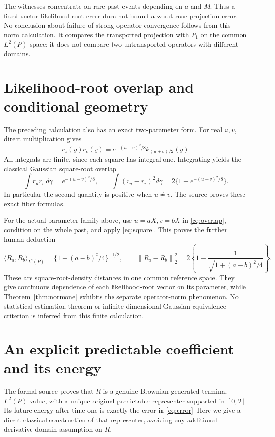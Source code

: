 \documentclass[11pt]{article}
\theoremstyle{remark}\newtheorem{remark}[theorem]{Remark}
\newcommand{\norm}[1]{\left\lVert#1\right\rVert}
\begin{document}
The witnesses concentrate on rare past events depending on $a$ and $M$. Thus a fixed-vector likelihood-root error does not bound a worst-case projection error. No conclusion about failure of strong-operator convergence follows from this norm calculation. It compares the transported projection with $P_1$ on the common $L^2(P)$ space; it does not compare two untransported operators with different domains.

\section{Likelihood-root overlap and conditional geometry}
The preceding calculation also has an exact two-parameter form. For real $u,v$, direct multiplication gives
\[
 r_u(y)r_v(y)=e^{-(u-v)^2/8}k_{(u+v)/2}(y).
\]
All integrals are finite, since each square has integral one. Integrating yields the classical Gaussian square-root overlap
\begin{equation}\label{eq:overlap}
 \int r_u r_v\,d\gamma=e^{-(u-v)^2/8},\qquad
 \int(r_u-r_v)^2d\gamma=2\{1-e^{-(u-v)^2/8}\}.
\end{equation}
In particular the second quantity is positive when $u\ne v$. The source proves these exact fiber formulas.

For the actual parameter family above, use $u=aX,v=bX$ in \eqref{eq:overlap}, condition on the whole past, and apply \eqref{eq:square}. This proves the further human deduction
\[
 \langle R_a,R_b\rangle_{L^2(P)}
 =\{1+(a-b)^2/4\}^{-1/2},\qquad
 \norm{R_a-R_b}_2^2=2\left\{1-\frac{1}{\sqrt{1+(a-b)^2/4}}\right\}.
\]
These are square-root-density distances in one common reference space. They give continuous dependence of each likelihood-root vector on its parameter, while Theorem~\ref{thm:normone} exhibits the separate operator-norm phenomenon. No statistical estimation theorem or infinite-dimensional Gaussian equivalence criterion is inferred from this finite calculation.

\section{An explicit predictable coefficient and its energy}
The formal source proves that $R$ is a genuine Brownian-generated terminal $L^2(P)$ value, with a unique original predictable representer supported in $[0,2]$. Its future energy after time one is exactly the error in \eqref{eq:error}. Here we give a direct classical construction of that representer, avoiding any additional derivative-domain assumption on $R$.
\end{document}

